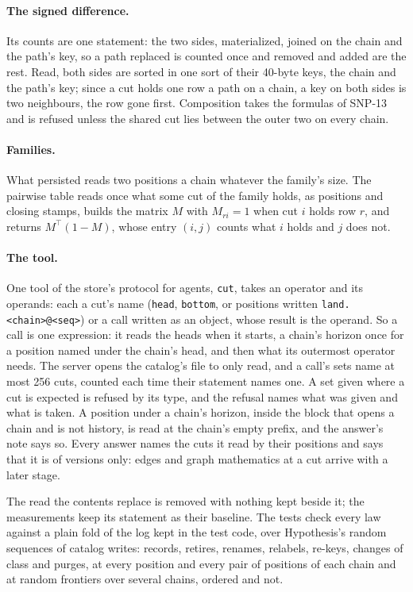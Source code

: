 \documentclass[11pt]{article}
\theoremstyle{plain}
\theoremstyle{definition}
\begin{document}
\paragraph{The signed difference.} Its counts are one statement: the two sides, materialized,
joined on the chain and the path's key, so a path replaced is counted once and removed and added
are the rest. Read, both sides are sorted in one sort of their 40-byte keys, the chain and the
path's key; since a cut holds one row a path on a chain, a key on both sides is two neighbours,
the row gone first. Composition takes the formulas of SNP-13 and is refused unless the shared cut
lies between the outer two on every chain.

\paragraph{Families.} What persisted reads two positions a chain whatever the family's size. The
pairwise table reads once what some cut of the family holds, as positions and closing stamps,
builds the matrix $M$ with $M_{ri} = 1$ when cut $i$ holds row $r$, and returns
$M^{\top}(1 - M)$, whose entry $(i,j)$ counts what $i$ holds and $j$ does not.

\paragraph{The tool.} One tool of the store's protocol for agents, \texttt{cut}, takes an operator
and its operands: each a cut's name (\texttt{head}, \texttt{bottom}, or positions written
\texttt{land.<chain>@<seq>}) or a call written as an object, whose result is the operand. So a
call is one expression: it reads the heads when it starts, a chain's horizon once for a position
named under the chain's head, and then what its outermost operator needs. The server opens the
catalog's file to only read, and a call's sets name at most 256 cuts, counted each time their
statement names one. A set given where a cut is expected is refused by its type, and the refusal
names what was given and what is taken. A
position under a chain's horizon, inside the block that opens a chain and is not history, is read
at the chain's empty prefix, and the answer's note says so. Every answer names the cuts it read
by their positions and says that it is of versions only: edges and graph mathematics at a cut
arrive with a later stage.

The read the contents replace is removed with nothing kept beside it; the measurements keep its
statement as their baseline. The tests check every law against a plain fold of the log kept in
the test code, over Hypothesis's random sequences of catalog writes: records, retires, renames,
relabels, re-keys, changes of class and purges, at every position and every pair of positions of
each chain and at random frontiers over several chains, ordered and not.
\end{document}
